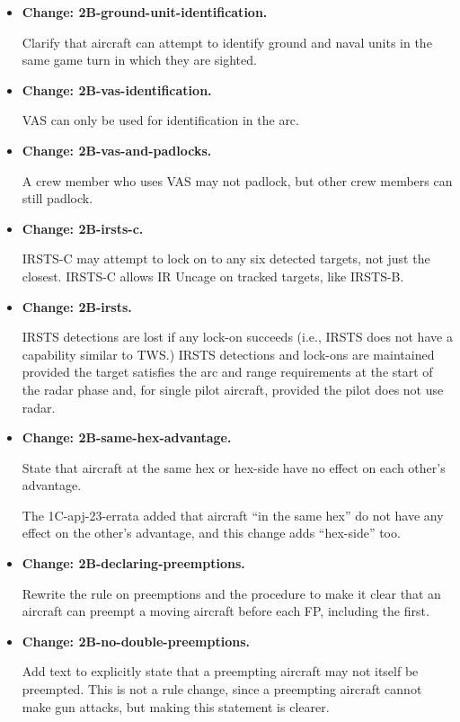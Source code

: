 \documentclass{report}
\newcommand{\changetag}[1]{\textbf{Change: #1.}\par}
\begin{document}
\begin{itemize}
        Aircraft can padlock ground units.

    \item\changetag{2B-ground-unit-identification}

        Clarify that aircraft can attempt to identify ground and naval units in the same game turn in which they are  sighted.

    \item\changetag{2B-vas-identification}

        VAS can only be used for identification in the  arc.

    \item\changetag{2B-vas-and-padlocks}

        A crew member who uses VAS may not padlock, but other crew members can still padlock.

    \item\changetag{2B-irsts-c}

        IRSTS-C may attempt to lock on to any six detected targets, not just the closest. IRSTS-C allows IR Uncage on tracked targets, like IRSTS-B.

    \item\changetag{2B-irsts}

        IRSTS detections are lost if any lock-on succeeds (i.e., IRSTS does not have a capability similar to TWS.) IRSTS detections and lock-ons are maintained provided the target satisfies the arc and range requirements at the start of the radar phase and, for single pilot aircraft, provided the pilot does not use radar.

    \item\changetag{2B-same-hex-advantage}

        State that aircraft at the same hex or hex-side have no effect on each other's advantage.

        The 1C-apj-23-errata added that aircraft “in the same hex” do not have any effect on the other's advantage, and this change adds “hex-side” too.

    \item\changetag{2B-declaring-preemptions}

        Rewrite the rule on preemptions and the procedure to make it clear that an aircraft can preempt a moving aircraft before each FP, including the first.

    \item\changetag{2B-no-double-preemptions}

        Add text to explicitly state that a preempting aircraft may not itself be preempted. This is not a rule change, since a preempting aircraft cannot make gun attacks, but making this statement is clearer.


\end{itemize}
\end{document}
